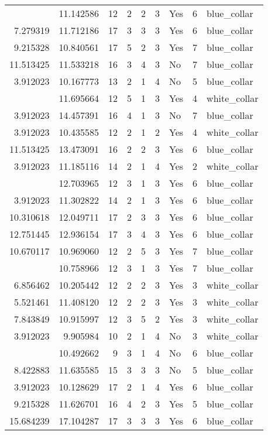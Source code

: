 \documentclass[
]{article}
\begin{document}
\begin{longtable}[t]{rrrrrllrl}
\addlinespace
7.346010 & 11.142586 & 12 & 2 & 2 & 3 & Yes & 6 & blue\_collar\\
7.279319 & 11.712186 & 17 & 3 & 3 & 3 & Yes & 6 & blue\_collar\\
9.215328 & 10.840561 & 17 & 5 & 2 & 3 & Yes & 7 & blue\_collar\\
11.513425 & 11.533218 & 16 & 3 & 4 & 3 & No & 7 & blue\_collar\\
3.912023 & 10.167773 & 13 & 2 & 1 & 4 & No & 5 & blue\_collar\\
\addlinespace
3.912023 & 11.695664 & 12 & 5 & 1 & 3 & Yes & 4 & white\_collar\\
3.912023 & 14.457391 & 16 & 4 & 1 & 3 & No & 7 & blue\_collar\\
3.912023 & 10.435585 & 12 & 2 & 1 & 2 & Yes & 4 & white\_collar\\
11.513425 & 13.473091 & 16 & 2 & 2 & 3 & Yes & 6 & blue\_collar\\
3.912023 & 11.185116 & 14 & 2 & 1 & 4 & Yes & 2 & white\_collar\\
\addlinespace
3.912023 & 12.703965 & 12 & 3 & 1 & 3 & Yes & 6 & blue\_collar\\
3.912023 & 11.302822 & 14 & 2 & 1 & 3 & Yes & 6 & blue\_collar\\
10.310618 & 12.049711 & 17 & 2 & 3 & 3 & Yes & 6 & blue\_collar\\
12.751445 & 12.936154 & 17 & 3 & 4 & 3 & Yes & 6 & blue\_collar\\
10.670117 & 10.969060 & 12 & 2 & 5 & 3 & Yes & 7 & blue\_collar\\
\addlinespace
3.912023 & 10.758966 & 12 & 3 & 1 & 3 & Yes & 7 & blue\_collar\\
6.856462 & 10.205442 & 12 & 2 & 2 & 3 & Yes & 3 & white\_collar\\
5.521461 & 11.408120 & 12 & 2 & 2 & 3 & Yes & 3 & white\_collar\\
7.843849 & 10.915997 & 12 & 3 & 5 & 2 & Yes & 3 & white\_collar\\
3.912023 & 9.905984 & 10 & 2 & 1 & 4 & No & 3 & white\_collar\\
\addlinespace
3.912023 & 10.492662 & 9 & 3 & 1 & 4 & No & 6 & blue\_collar\\
8.422883 & 11.635585 & 15 & 3 & 3 & 3 & No & 5 & blue\_collar\\
3.912023 & 10.128629 & 17 & 2 & 1 & 4 & Yes & 6 & blue\_collar\\
9.215328 & 11.626701 & 16 & 4 & 2 & 3 & Yes & 5 & blue\_collar\\
15.684239 & 17.104287 & 17 & 3 & 3 & 3 & Yes & 6 & blue\_collar\\

\end{longtable}
\end{document}

